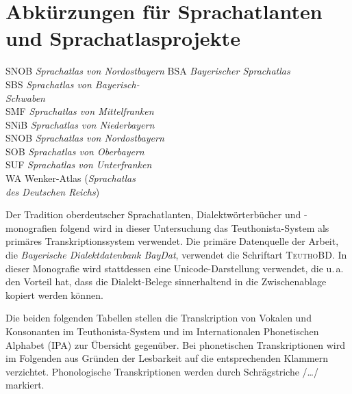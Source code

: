 \section*{Abkürzungen für Sprachatlanten und Sprachatlasprojekte}
\begin{multicols}{2}
\begin{tabbing}
SNOB \= \textit{Sprachatlas von Nordostbayern}\kill
BSA  \>  \textit{Bayerischer Sprachatlas}\\
SBS \>   \textit{Sprachatlas von Bayerisch-} \\ \> \textit{Schwaben}\\
SMF \>   \textit{Sprachatlas von Mittelfranken}\\
SNiB \>   \textit{Sprachatlas von Niederbayern}\\
SNOB \>   \textit{Sprachatlas von Nordostbayern}\\
SOB  \>  \textit{Sprachatlas von Oberbayern}\\
SUF \>   \textit{Sprachatlas von Unterfranken}\\
WA \>   Wenker-Atlas (\textit{Sprachatlas} \\ \> \textit{des Deutschen Reichs})
\end{tabbing}
\end{multicols}



Der Tradition oberdeutscher Sprachatlanten, Dialektwörterbücher und -mo\-no\-gra\-fi\-en folgend wird in dieser Untersuchung das Teuthonista-System als primäres Transkriptionssystem verwendet. Die primäre Datenquelle der Arbeit, die \textit{Bayerische Dialektdatenbank BayDat}, verwendet die Schriftart \textsc{TeuthoBD}. In dieser Monografie wird stattdessen eine Unicode-Darstellung verwendet, die u.\,a. den Vorteil hat, dass die Dialekt-Belege sinnerhaltend in die Zwischenablage kopiert werden können.

\begin{sloppypar}
Die beiden folgenden Tabellen stellen die Transkription von Vokalen und Konsonanten im Teuthonista-System und im Internationalen Phonetischen Alphabet (IPA) zur Übersicht gegenüber. Bei phonetischen Transkriptionen wird im Folgenden aus Gründen der Lesbarkeit auf die entsprechenden Klammern verzichtet. Phonologische Transkriptionen werden durch Schrägstriche /\ldots/ markiert. 
\end{sloppypar}

